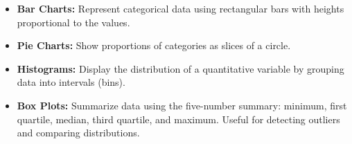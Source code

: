 \begin{itemize}
    \item \textbf{Bar Charts:} Represent categorical data using rectangular bars with heights proportional to the values.

    \begin{center}
    \end{center}

    \item \textbf{Pie Charts:} Show proportions of categories as slices of a circle.

    \begin{center}
        \begin{center}
    \end{center}
    \end{center}

    \item \textbf{Histograms:} Display the distribution of a quantitative variable by grouping data into intervals (bins).

    \begin{center}
    \end{center}

    \item \textbf{Box Plots:} Summarize data using the five-number summary: minimum, first quartile, median, third quartile, and maximum. Useful for detecting outliers and comparing distributions.

\end{itemize}

